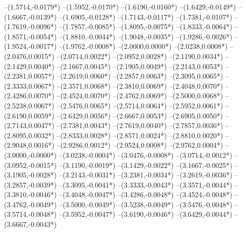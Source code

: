 {	--(1.5714,{-0.0179*\yskala})
	--(1.5952,{-0.0170*\yskala})
	--(1.6190,{-0.0160*\yskala})
	--(1.6429,{-0.0149*\yskala})
	--(1.6667,{-0.0139*\yskala})
	--(1.6905,{-0.0128*\yskala})
	--(1.7143,{-0.0117*\yskala})
	--(1.7381,{-0.0107*\yskala})
	--(1.7619,{-0.0096*\yskala})
	--(1.7857,{-0.0085*\yskala})
	--(1.8095,{-0.0075*\yskala})
	--(1.8333,{-0.0064*\yskala})
	--(1.8571,{-0.0054*\yskala})
	--(1.8810,{-0.0044*\yskala})
	--(1.9048,{-0.0035*\yskala})
	--(1.9286,{-0.0026*\yskala})
	--(1.9524,{-0.0017*\yskala})
	--(1.9762,{-0.0008*\yskala})
	--(2.0000,{0.0000*\yskala})
	--(2.0238,{0.0008*\yskala})
	--(2.0476,{0.0015*\yskala})
	--(2.0714,{0.0022*\yskala})
	--(2.0952,{0.0028*\yskala})
	--(2.1190,{0.0034*\yskala})
	--(2.1429,{0.0040*\yskala})
	--(2.1667,{0.0045*\yskala})
	--(2.1905,{0.0049*\yskala})
	--(2.2143,{0.0053*\yskala})
	--(2.2381,{0.0057*\yskala})
	--(2.2619,{0.0060*\yskala})
	--(2.2857,{0.0063*\yskala})
	--(2.3095,{0.0065*\yskala})
	--(2.3333,{0.0067*\yskala})
	--(2.3571,{0.0068*\yskala})
	--(2.3810,{0.0069*\yskala})
	--(2.4048,{0.0070*\yskala})
	--(2.4286,{0.0070*\yskala})
	--(2.4524,{0.0070*\yskala})
	--(2.4762,{0.0069*\yskala})
	--(2.5000,{0.0068*\yskala})
	--(2.5238,{0.0067*\yskala})
	--(2.5476,{0.0065*\yskala})
	--(2.5714,{0.0064*\yskala})
	--(2.5952,{0.0061*\yskala})
	--(2.6190,{0.0059*\yskala})
	--(2.6429,{0.0056*\yskala})
	--(2.6667,{0.0053*\yskala})
	--(2.6905,{0.0050*\yskala})
	--(2.7143,{0.0047*\yskala})
	--(2.7381,{0.0043*\yskala})
	--(2.7619,{0.0040*\yskala})
	--(2.7857,{0.0036*\yskala})
	--(2.8095,{0.0032*\yskala})
	--(2.8333,{0.0028*\yskala})
	--(2.8571,{0.0024*\yskala})
	--(2.8810,{0.0020*\yskala})
	--(2.9048,{0.0016*\yskala})
	--(2.9286,{0.0012*\yskala})
	--(2.9524,{0.0008*\yskala})
	--(2.9762,{0.0004*\yskala})
	--(3.0000,{-0.0000*\yskala})
	--(3.0238,{-0.0004*\yskala})
	--(3.0476,{-0.0008*\yskala})
	--(3.0714,{-0.0012*\yskala})
	--(3.0952,{-0.0015*\yskala})
	--(3.1190,{-0.0019*\yskala})
	--(3.1429,{-0.0022*\yskala})
	--(3.1667,{-0.0025*\yskala})
	--(3.1905,{-0.0028*\yskala})
	--(3.2143,{-0.0031*\yskala})
	--(3.2381,{-0.0034*\yskala})
	--(3.2619,{-0.0036*\yskala})
	--(3.2857,{-0.0039*\yskala})
	--(3.3095,{-0.0041*\yskala})
	--(3.3333,{-0.0043*\yskala})
	--(3.3571,{-0.0044*\yskala})
	--(3.3810,{-0.0046*\yskala})
	--(3.4048,{-0.0047*\yskala})
	--(3.4286,{-0.0048*\yskala})
	--(3.4524,{-0.0048*\yskala})
	--(3.4762,{-0.0049*\yskala})
	--(3.5000,{-0.0049*\yskala})
	--(3.5238,{-0.0049*\yskala})
	--(3.5476,{-0.0048*\yskala})
	--(3.5714,{-0.0048*\yskala})
	--(3.5952,{-0.0047*\yskala})
	--(3.6190,{-0.0046*\yskala})
	--(3.6429,{-0.0044*\yskala})
	--(3.6667,{-0.0043*\yskala})
}
